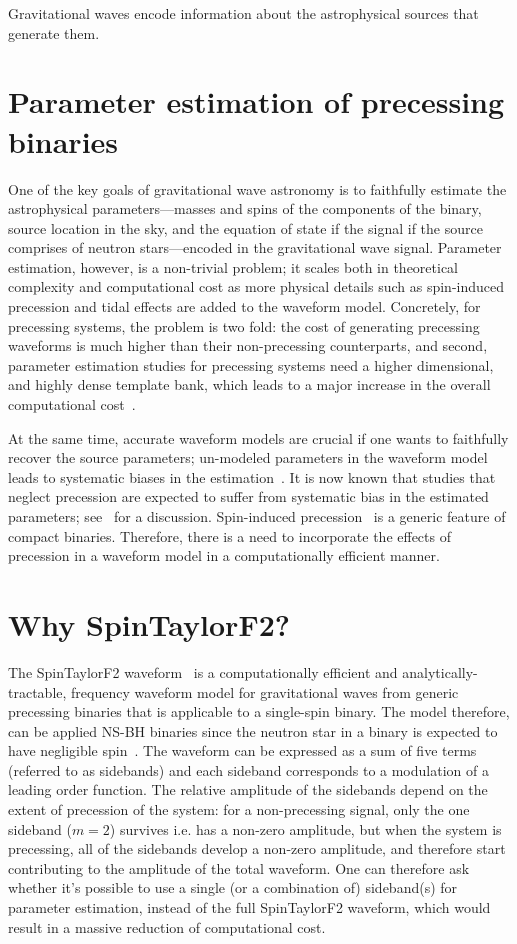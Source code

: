 Gravitational waves encode information about the astrophysical sources that
generate them. 

\section{Parameter estimation of precessing binaries}

One of the key goals of gravitational wave astronomy is to faithfully estimate
the astrophysical parameters---masses and spins of the components of the
binary, source location in the sky, and the equation of state if the signal if
the source comprises of neutron stars---encoded in the gravitational wave
signal. Parameter estimation, however, is a non-trivial  problem; it scales
both in theoretical complexity and computational cost as more physical details
such as spin-induced precession and tidal effects are added to the waveform
model. Concretely, for precessing systems, the problem is two fold: the cost
of generating precessing waveforms is much higher than their non-precessing
counterparts, and second, parameter estimation studies for precessing systems
need a higher dimensional, and highly dense template bank, which leads to a
major increase in the overall computational cost~\cite{Nat2017}.

At the same time, accurate waveform models are crucial if one wants to
faithfully recover the source parameters; un-modeled parameters in the
waveform model leads to systematic biases in the estimation~\cite{Bias_1,
Bias_2}.  It is now known that studies that neglect precession are expected to
suffer from systematic bias in the estimated parameters; see~\cite{Bias_1,
Bias_3}  for a discussion. Spin-induced precession~\cite{Apostolatos1994} is a
generic feature of compact binaries.  Therefore, there is a need to
incorporate the effects of precession in a waveform model in a computationally
efficient manner.

\section{Why SpinTaylorF2?}

The SpinTaylorF2 waveform~\cite{Lundgren2014} is a computationally efficient and
analytically-tractable, frequency waveform model for gravitational waves from
generic precessing binaries that is applicable to a single-spin binary. The
model therefore, can be applied NS-BH binaries since the neutron star in a
binary is expected to have negligible spin~\cite{NSBH_upperlims, Brown2012,
Kramer}. The waveform can be expressed as a sum of five terms (referred to as
sidebands) and each sideband corresponds to a modulation of a leading order
function. The relative amplitude of the sidebands depend on the extent of
precession of the system: for a non-precessing signal, only the one sideband
($m=2$) survives i.e. has a non-zero amplitude, but when the system is
precessing, all of the sidebands develop a non-zero amplitude, and therefore
start contributing to the amplitude of the total waveform. One can therefore ask
whether it's possible to use a single (or a combination of) sideband(s) for
parameter estimation, instead of the full SpinTaylorF2 waveform, which would
result in  a massive reduction of computational cost.

